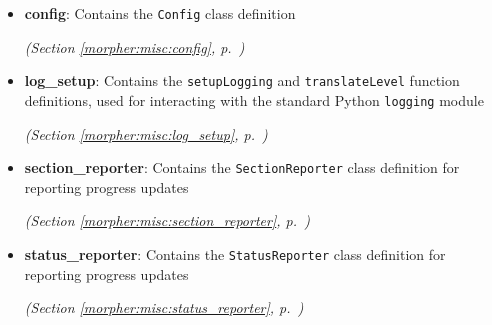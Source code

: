 \begin{itemize}
\setlength{\parskip}{0ex}
\item \textbf{config}: Contains the \texttt{Config} class definition



  \textit{(Section \ref{morpher:misc:config}, p.~\pageref{morpher:misc:config})}

\item \textbf{log\_setup}: Contains the \texttt{setupLogging} and \texttt{translateLevel} function 
definitions, used for interacting with the standard Python \texttt{logging}
module



  \textit{(Section \ref{morpher:misc:log_setup}, p.~\pageref{morpher:misc:log_setup})}

\item \textbf{section\_reporter}: Contains the \texttt{SectionReporter} class definition for reporting 
progress updates



  \textit{(Section \ref{morpher:misc:section_reporter}, p.~\pageref{morpher:misc:section_reporter})}

\item \textbf{status\_reporter}: Contains the \texttt{StatusReporter} class definition for reporting 
progress updates



  \textit{(Section \ref{morpher:misc:status_reporter}, p.~\pageref{morpher:misc:status_reporter})}

\end{itemize}

